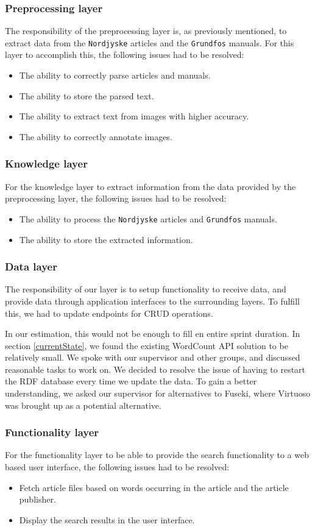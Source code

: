 \subsubsection*{Preprocessing layer}
The responsibility of the preprocessing layer is, as previously mentioned, to extract data from the \texttt{Nordjyske} articles and the \texttt{Grundfos} manuals. For this layer to accomplish this, the following issues had to be resolved:
\begin{itemize}
    \item The ability to correctly parse articles and manuals.
    \item The ability to store the parsed text.
    \item The ability to extract text from images with higher accuracy.
    \item The ability to correctly annotate images.
\end{itemize}

\subsubsection*{Knowledge layer}
For the knowledge layer to extract information from the data provided by the preprocessing layer, the following issues had to be resolved:
\begin{itemize}
    \item The ability to process the \texttt{Nordjyske} articles and \texttt{Grundfos} manuals.
    \item The ability to store the extracted information.
\end{itemize}

\subsubsection*{Data layer}
The responsibility of our layer is to setup functionality to receive data, and provide data through application interfaces to the surrounding layers.
To fulfill this, we had to update endpoints for CRUD operations.

In our estimation, this would not be enough to fill en entire sprint duration. In section \ref{currentState}, we found the existing WordCount API solution to be relatively small.
We spoke with our supervisor and other groups, and discussed reasonable tasks to work on. We decided to resolve the issue of having to restart the RDF database every time we update the data. To gain a better understanding, we asked our supervisor for alternatives to Fuseki, where Virtuoso was brought up as a potential alternative.

\subsubsection*{Functionality layer}
For the functionality layer to be able to provide the search functionality to a web based user interface, the following issues had to be resolved:
\begin{itemize}
    \item Fetch article files based on words occurring in the article and the article publisher.
    \item Display the search results in the user interface.
\end{itemize}